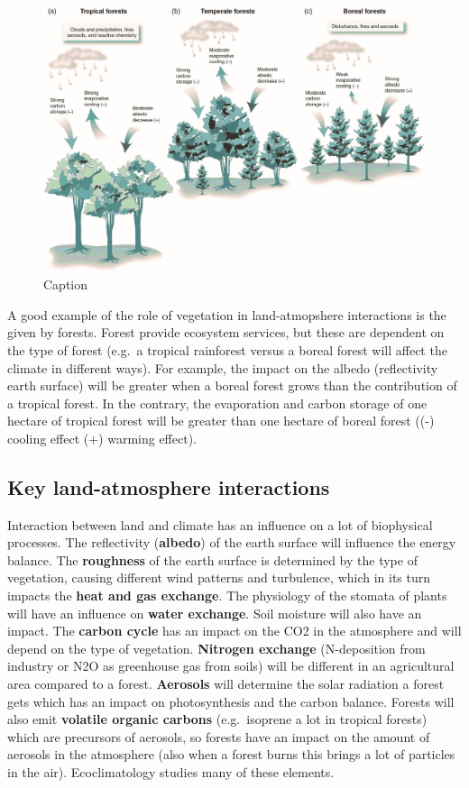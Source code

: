 \documentclass[oneside]{book}
\begin{document}
\begin{figure}

{\centering \includegraphics[width=0.8\linewidth]{figures/Figure110} 

}

\caption{Caption}\label{fig:Biogeoscience2}
\end{figure}

A good example of the role of vegetation in land-atmopshere interactions
is the given by forests. Forest provide ecosystem services, but these
are dependent on the type of forest (e.g.~a tropical rainforest versus a
boreal forest will affect the climate in different ways). For example,
the impact on the albedo (reflectivity earth surface) will be greater
when a boreal forest grows than the contribution of a tropical forest.
In the contrary, the evaporation and carbon storage of one hectare of
tropical forest will be greater than one hectare of boreal forest ((-)
cooling effect (+) warming effect).

\subsection{Key land-atmosphere
interactions}\label{key-land-atmosphere-interactions}

Interaction between land and climate has an influence on a lot of
biophysical processes. The reflectivity (\textbf{albedo}) of the earth
surface will influence the energy balance. The \textbf{roughness} of the
earth surface is determined by the type of vegetation, causing different
wind patterns and turbulence, which in its turn impacts the \textbf{heat
and gas exchange}. The physiology of the stomata of plants will have an
influence on \textbf{water exchange}. Soil moisture will also have an
impact. The \textbf{carbon cycle} has an impact on the CO2 in the
atmosphere and will depend on the type of vegetation. \textbf{Nitrogen
exchange} (N-deposition from industry or N2O as greenhouse gas from
soils) will be different in an agricultural area compared to a forest.
\textbf{Aerosols} will determine the solar radiation a forest gets which
has an impact on photosynthesis and the carbon balance. Forests will
also emit \textbf{volatile organic carbons} (e.g.~isoprene a lot in
tropical forests) which are precursors of aerosols, so forests have an
impact on the amount of aerosols in the atmosphere (also when a forest
burns this brings a lot of particles in the air). Ecoclimatology studies
many of these elements.
\end{document}
